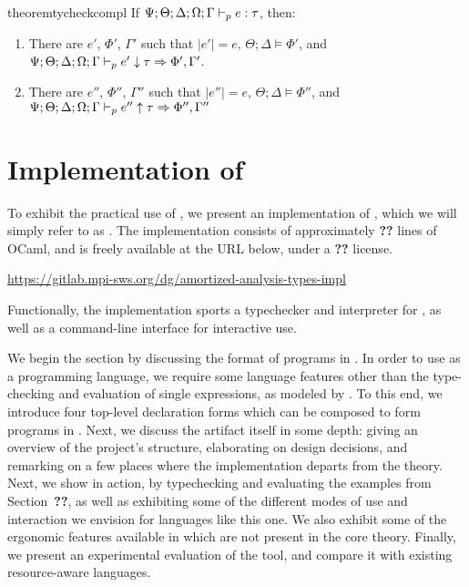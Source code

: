 \begin{restatable}{theorem}{tycheckcompl}
If $\Psi;\Theta;\Delta;\Omega;\Gamma \vdash_p e : \tau$, then:
\begin{enumerate}
  \item There are $e'$, $\Phi'$, $\Gamma'$ such that $|e'| = e$, $\Theta ; \Delta \vDash \Phi'$, and $\Psi;\Theta;\Delta;\Omega;\Gamma \vdash_p e' \downarrow \tau \Rightarrow \Phi', \Gamma'$.
  \item There are $e''$, $\Phi''$, $\Gamma''$ such that $|e''| = e$, $\Theta ; \Delta \vDash \Phi''$, and $\Psi;\Theta;\Delta;\Omega;\Gamma \vdash_p e'' \uparrow \tau \Rightarrow \Phi'',\Gamma''$
\end{enumerate}
\label{thm:tycheck-compl}
\end{restatable}


\section{Implementation of \lambdaamor}
\label{sec:lambdaamor-impl}
To exhibit the practical use of \dlambdaamor, we present an implementation of \bilambdaamor, which we will simply refer to as \lambdaamorimpl. The implementation consists of approximately \textbf{??} lines of OCaml, and is freely available at the URL below, under a \textbf{??} license.
\begin{center}
\url{https://gitlab.mpi-sws.org/dg/amortized-analysis-types-impl}
\end{center}
Functionally, the implementation sports a typechecker and interpreter for \dlambdaamor, as well as a command-line interface for interactive use.

We begin the section by discussing the format of programs in \lambdaamorimpl. In order to use \lambdaamorimpl as a programming language, we require some language features other than the type-checking and evaluation of single expressions, as modeled by \bilambdaamor. To this end, we introduce four top-level declaration forms which can be composed to form programs in \lambdaamorimpl. Next, we discuss the artifact itself in some depth: giving an overview of the project's structure, elaborating on design decisions, and remarking on a few places where the implementation departs from the theory.
 Next, we show \lambdaamorimpl in action, by typechecking and evaluating the examples from Section~\textbf{??}, as well as exhibiting some of the different modes of use and interaction we envision for languages like this one. We also exhibit some of the ergonomic features available in \lambdaamorimpl which are not present in the core theory. Finally, we present an experimental evaluation of the tool, and compare it with existing resource-aware languages.
 

